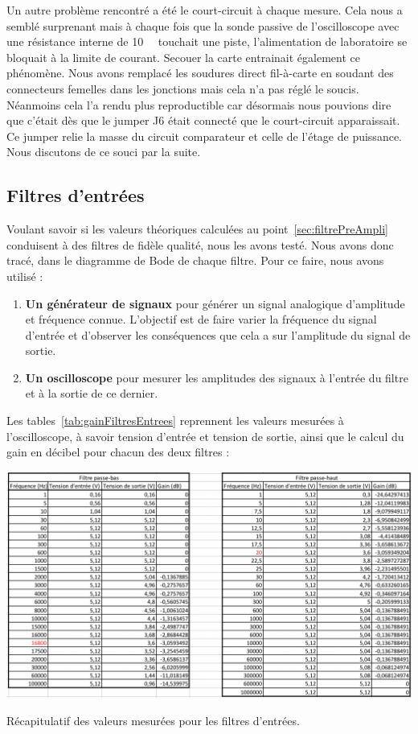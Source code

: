 \documentclass[10pt, oneside, a4paper]{article}
\begin{document}
Un autre problème rencontré a été le court-circuit à chaque mesure.
Cela nous a semblé surprenant mais à chaque fois que la sonde passive de l'oscilloscope avec une résistance interne de \SI{10}{\mega\Omega} touchait une piste, l'alimentation de laboratoire se bloquait à la limite de courant.
Secouer la carte entrainait également ce phénomène.
Nous avons remplacé les soudures direct fil-à-carte en soudant des connecteurs femelles dans les jonctions mais cela n'a pas réglé le soucis.
Néanmoins cela l'a rendu plus reproductible car désormais nous pouvions dire que c'était dès que le jumper J6 était connecté que le court-circuit apparaissait.
Ce jumper relie la masse du circuit comparateur et celle de l'étage de puissance.
Nous discutons de ce souci par la suite.

\subsection{Filtres d'entrées}
Voulant savoir si les valeurs théoriques calculées au point~\ref{sec:filtrePreAmpli}
conduisent à des filtres de fidèle qualité, nous les avons testé.
Nous avons donc tracé, dans le diagramme de Bode de chaque filtre.
Pour ce faire, nous avons utilisé :
\begin{enumerate}
    \item\textbf{Un générateur de signaux} pour générer un signal analogique
        d'amplitude et fréquence connue.
        L'objectif est de faire varier la fréquence du signal d'entrée et d'observer les
        conséquences que cela a sur l'amplitude du signal de sortie.
    \item\textbf{Un oscilloscope} pour mesurer les amplitudes des signaux à l'entrée du
        filtre et à la sortie de ce dernier.
\end{enumerate}

Les tables~\ref{tab:gainFiltresEntrees} reprennent les valeurs mesurées à l'oscilloscope, à savoir tension d'entrée et tension de sortie, ainsi que le calcul du gain en décibel pour chacun des deux filtres :
\begin{table}[!ht]
    \centering
    \includegraphics[scale=0.57]{image/resultat-filtres.jpg}
    \caption{Récapitulatif des valeurs mesurées pour les filtres d'entrées.}
    \label{tab:gainFiltresEntrees}
\end{table}
\end{document}
